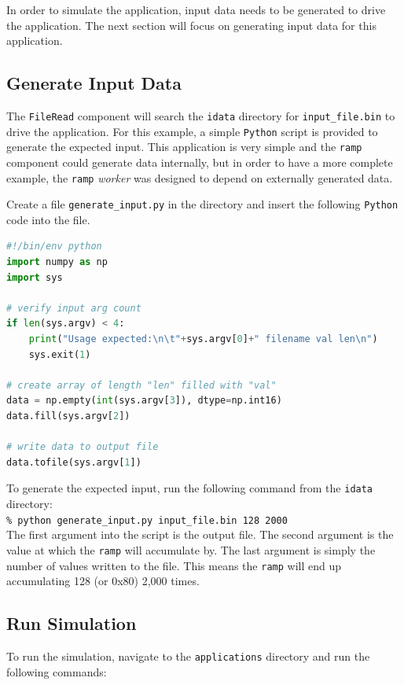 In order to simulate the application, input data needs to be generated to drive the application. The next section will focus on generating input data for this application.

\subsection{Generate Input Data}
The \verb+FileRead+ component will search the \verb+idata+ directory for \verb+input_file.bin+ to drive the application. For this example, a simple \verb+Python+ script is provided to generate the expected input. This application is very simple and the \verb+ramp+ component could generate data internally, but in order to have a more complete example, the \verb+ramp+ \textit{worker} was designed to depend on externally generated data. \newline

Create a file \verb+generate_input.py+ in the  directory and insert the following \verb+Python+ code into the file.
\begin{lstlisting}[language=python]
#!/bin/env python
import numpy as np
import sys

# verify input arg count
if len(sys.argv) < 4:
    print("Usage expected:\n\t"+sys.argv[0]+" filename val len\n")
    sys.exit(1)

# create array of length "len" filled with "val"
data = np.empty(int(sys.argv[3]), dtype=np.int16)
data.fill(sys.argv[2])

# write data to output file
data.tofile(sys.argv[1])
\end{lstlisting}

To generate the expected input, run the following command from the \verb+idata+ directory:\\

\forceindent\verb+% python generate_input.py input_file.bin 128 2000+\\

The first argument into the script is the output file. The second argument is the value at which the \verb+ramp+ will accumulate by. The last argument is simply the number of values written to the file. This means the \verb+ramp+ will end up accumulating 128 (or 0x80) 2,000 times.

\subsection{Run Simulation}
\bstart
To run the simulation, navigate to the \verb+applications+ directory and run the following commands:\\


